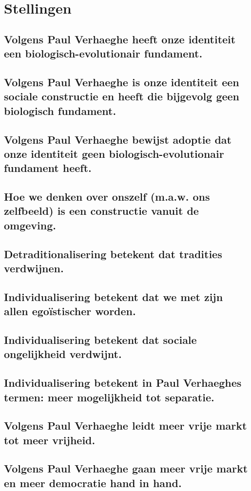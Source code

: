 \documentclass[main.tex]{subfiles}
\begin{document}
\section{Stellingen}

\subsection{Volgens Paul Verhaeghe heeft onze identiteit een biologisch-evolutionair fundament.}
\subsection{Volgens Paul Verhaeghe is onze identiteit een sociale constructie en heeft die bijgevolg geen biologisch fundament.}
\subsection{Volgens Paul Verhaeghe bewijst adoptie dat onze identiteit geen biologisch-evolutionair fundament heeft.}
\subsection{Hoe we denken over onszelf (m.a.w. ons zelfbeeld) is een constructie vanuit de omgeving.}
\subsection{Detraditionalisering betekent dat tradities verdwijnen.}
\subsection{Individualisering betekent dat we met zijn allen egoïstischer worden.}
\subsection{Individualisering betekent dat sociale ongelijkheid verdwijnt.}
\subsection{Individualisering betekent in Paul Verhaeghes termen: meer mogelijkheid tot separatie.}
\subsection{Volgens Paul Verhaeghe leidt meer vrije markt tot meer vrijheid.}
\subsection{Volgens Paul Verhaeghe gaan meer vrije markt en meer democratie hand in hand.}
\end{document}
